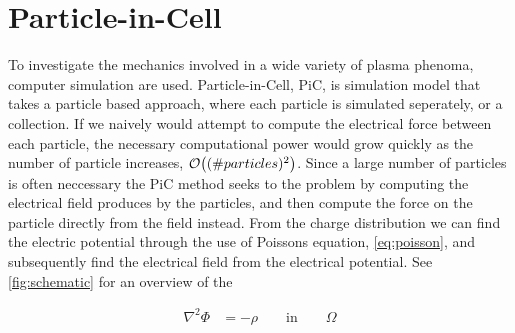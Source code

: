\section{Particle-in-Cell}
 To investigate the mechanics involved in a wide variety of plasma phenoma,
 computer simulation are used. Particle-in-Cell, PiC, is simulation model that takes a
 particle based approach, where each particle is simulated seperately, or a
 collection. If we naively would attempt to compute the electrical force between each particle, the necessary
 computational power would grow quickly as the number of particle increases, \(\order{(\#particles)^2}\).
 Since a large number of particles is often neccessary the PiC method seeks to
 the problem by computing the electrical field produces by the particles, and then
 compute the force on the particle directly from the field instead. From the charge
 distribution we can find the electric potential through the use of Poissons
 equation, \cref{eq:poisson}, and subsequently find the electrical field from
 the electrical potential. See \cref{fig:schematic} for an overview of the

    \begin{align}
        \nabla ^2 \Phi &= -\rho \qquad \text{in} \qquad \Omega \label{eq:poisson}
    \end{align}

  

